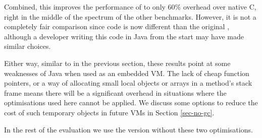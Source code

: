 Combined, this improves the performance of  to only 60\% overhead over native C, right in the middle of the spectrum of the other benchmarks. However, it is not a completely fair comparison since code is now different than the original , although a developer writing this code in Java from the start may have made similar choices.

Either way, similar to  in the previous section, these results point at some weaknesses of Java when used as an embedded VM. The lack of cheap function pointers, or a way of allocating small local objects or arrays in a method's stack frame means there will be a significant overhead in situations where the optimisations used here cannot be applied. We discuss some options to reduce the cost of such temporary objects in future VMs in Section \ref{sec-no-gc}.

In the rest of the evaluation we use the  version without these two optimisations.




















